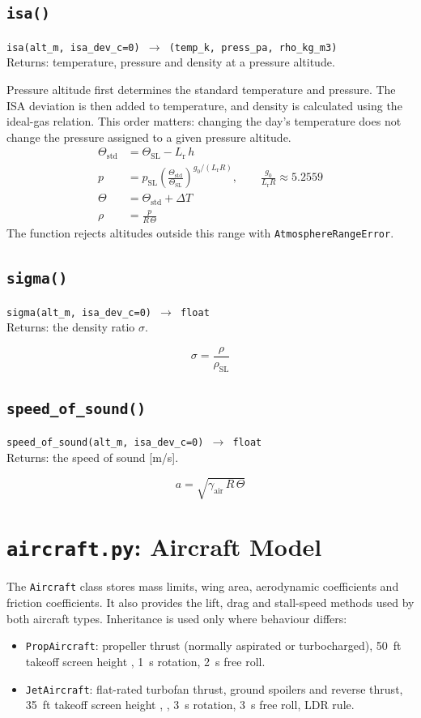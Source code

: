 \documentclass[11pt,letterpaper]{article}
\numberwithin{equation}{section}
\newcommand{\func}[2]{\begin{funcbox}\texttt{#1}\\[2pt]{\color{ink3}Returns:} #2\end{funcbox}}
\newcommand{\code}[1]{\textmd{\texttt{#1}}}
\begin{document}
\subsection{\code{isa()}}
\func{isa(alt\_m, isa\_dev\_c=0) $\rightarrow$ (temp\_k, press\_pa, rho\_kg\_m3)}{temperature, pressure and density at a pressure altitude.}
Pressure altitude first determines the standard temperature and pressure. The ISA deviation is then added to temperature, and density is calculated using the ideal-gas relation. This order matters: changing the day's temperature does not change the pressure assigned to a given pressure altitude.
\begin{align}
\Theta_\text{std} &= \Theta_\text{SL} - L_\text{r}\,h \label{eq:isa-temp}\\
p &= p_\text{SL}\left(\frac{\Theta_\text{std}}{\Theta_\text{SL}}\right)^{g_0/(L_\text{r}R)}, \qquad \frac{g_0}{L_\text{r}R} \approx 5.2559 \label{eq:isa-p}\\
\Theta &= \Theta_\text{std} + \Delta T \label{eq:isa-theta}\\
\rho &= \frac{p}{R\,\Theta} \label{eq:isa-rho}
\end{align}
The function rejects altitudes outside this range with \code{AtmosphereRangeError}.

\subsection{\code{sigma()}}
\func{sigma(alt\_m, isa\_dev\_c=0) $\rightarrow$ float}{the density ratio $\sigma$.}
\begin{equation}
\sigma = \frac{\rho}{\rho_\text{SL}} \label{eq:isa-sigma}
\end{equation}

\subsection{\code{speed\_of\_sound()}}
\func{speed\_of\_sound(alt\_m, isa\_dev\_c=0) $\rightarrow$ float}{the speed of sound [m/s].}
\begin{equation}
a = \sqrt{\gamma_\text{air}\,R\,\Theta} \label{eq:isa-a}
\end{equation}

\section{\code{aircraft.py}: Aircraft Model}\label{sec:aircraft}
The \code{Aircraft} class stores mass limits, wing area, aerodynamic coefficients and friction coefficients. It also provides the lift, drag and stall-speed methods used by both aircraft types. Inheritance is used only where behaviour differs:
\begin{itemize}
\item \code{PropAircraft}: propeller thrust (normally aspirated or turbocharged), \SI{50}{ft} takeoff screen height \cite{14CFR23}, \SI{1}{s} rotation, \SI{2}{s} free roll.
\item \code{JetAircraft}: flat-rated turbofan thrust, ground spoilers and reverse thrust, \SI{35}{ft} takeoff screen height \cite{14CFR25}, \cite{CAR525}, \SI{3}{s} rotation, \SI{3}{s} free roll, LDR rule.
\end{itemize}
\end{document}
